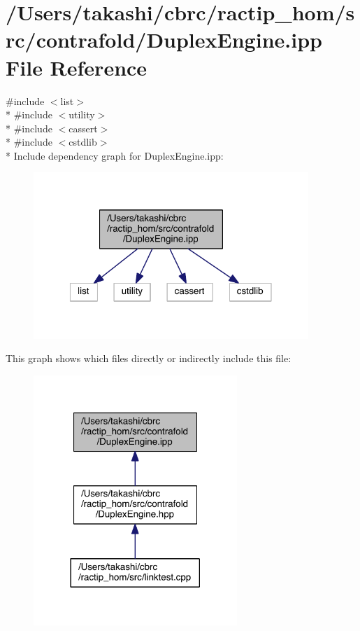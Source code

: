 \hypertarget{_duplex_engine_8ipp}{\section{/\+Users/takashi/cbrc/ractip\+\_\+hom/src/contrafold/\+Duplex\+Engine.ipp File Reference}
\label{_duplex_engine_8ipp}
}
{\ttfamily \#include $<$list$>$}\\*
{\ttfamily \#include $<$utility$>$}\\*
{\ttfamily \#include $<$cassert$>$}\\*
{\ttfamily \#include $<$cstdlib$>$}\\*
Include dependency graph for Duplex\+Engine.\+ipp\+:
\nopagebreak
\begin{figure}[H]
\begin{center}
\leavevmode
\includegraphics[width=295pt]{_duplex_engine_8ipp__incl}
\end{center}
\end{figure}
This graph shows which files directly or indirectly include this file\+:
\nopagebreak
\begin{figure}[H]
\begin{center}
\leavevmode
\includegraphics[width=218pt]{_duplex_engine_8ipp__dep__incl}
\end{center}
\end{figure}
